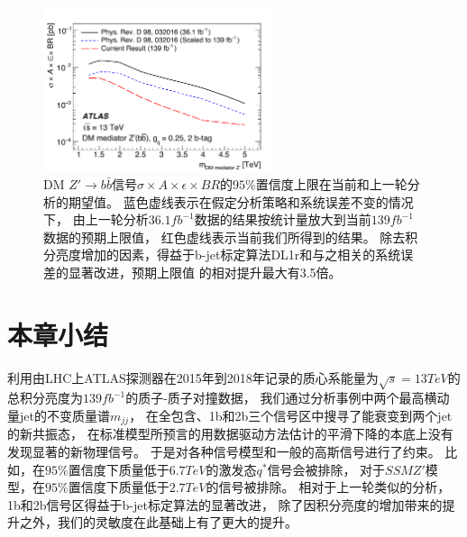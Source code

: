 \begin{figure}[htbp]
\centering
\includegraphics[width=0.6\textwidth]{figs/fig_09.pdf}
\caption{
DM $Z' \to b\bar{b}$信号$\sigma\times A \times \epsilon \times BR$的$95\%$置信度上限在当前和上一轮分析的期望值。
蓝色虚线表示在假定分析策略和系统误差不变的情况下，
由上一轮分析$36.1fb^{-1}$数据的结果按统计量放大到当前$139fb^{-1}$数据的预期上限值，
红色虚线表示当前我们所得到的结果。
除去积分亮度增加的因素，得益于b-jet标定算法DL1r和与之相关的系统误差的显著改进，预期上限值
的相对提升最大有3.5倍。
}
\label{fig:money_analysis}
\end{figure}



\section{本章小结} 
\label{sec:DijetCon}

利用由LHC上ATLAS探测器在2015年到2018年记录的质心系能量为$\sqrt{s}=13TeV$的总积分亮度为$139fb^{-1}$的质子-质子对撞数据，
我们通过分析事例中两个最高横动量jet的不变质量谱$m_{jj}$，
在全包含、1b和2b三个信号区中搜寻了能衰变到两个jet的新共振态，
在标准模型所预言的用数据驱动方法估计的平滑下降的本底上没有发现显著的新物理信号。
于是对各种信号模型和一般的高斯信号进行了约束。
比如，在$95\%$置信度下质量低于$6.7TeV$的激发态$q^*$信号会被排除，
对于$SSM Z'$模型，在$95\%$置信度下质量低于$2.7TeV$的信号被排除。
相对于上一轮类似的分析，
1b和2b信号区得益于b-jet标定算法的显著改进，
除了因积分亮度的增加带来的提升之外，我们的灵敏度在此基础上有了更大的提升。





